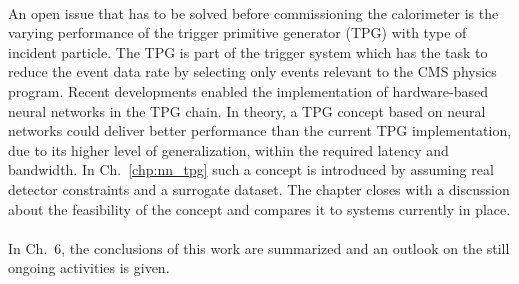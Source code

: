 \documentclass[../../main.tex]{subfiles}
\begin{document}
\\
An open issue that has to be solved before commissioning the calorimeter is the varying performance of the trigger primitive generator (TPG) \cite{tdr_trig} with type of incident particle. The TPG is part of the trigger system which has the task to reduce the event data rate by selecting only events relevant to the CMS physics program. Recent developments enabled the implementation of hardware-based neural networks in the TPG chain. In theory, a TPG concept based on neural networks could deliver better performance than the current TPG implementation, due to its higher level of generalization, within the required latency and bandwidth. In Ch.~\ref{chp:nn_tpg} such a concept is introduced by assuming real detector constraints and a surrogate dataset. The chapter closes with a discussion about the feasibility of the concept and compares it to systems currently in place.\\
\\
In Ch.~6, the conclusions of this work are summarized and an outlook on the still ongoing activities is given.
\end{document}
